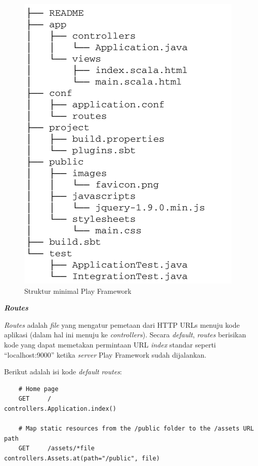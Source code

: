 \documentclass[a4paper,twoside]{article}
\begin{document}
\begin{enumerate}
\begin{itemize}
\begin{figure}[htbp]
	\centering
		\includegraphics[scale=0.7]{Gambar/2_strukturplay.PNG}
	\caption{Struktur minimal Play Framework}
	\label{fig:2_strukturplay}
\end{figure}

\textbf{\textit{Routes}}

\textit{Routes} adalah \textit{file} yang mengatur pemetaan dari HTTP URLs menuju kode aplikasi (dalam hal ini menuju ke \textit{controllers}). Secara \textit{default}, \textit{routes} berisikan kode yang dapat memetakan permintaan URL \textit{index} standar seperti ``localhost:9000'' ketika \textit{server} Play Framework sudah dijalankan.

Berikut adalah isi kode \textit{default} \textit{routes}:

\begin{lstlisting}
	# Home page
	GET     /                           controllers.Application.index()

	# Map static resources from the /public folder to the /assets URL path
	GET     /assets/*file               controllers.Assets.at(path="/public", file)
\end{lstlisting}


\end{itemize}
\end{enumerate}
\end{document}
